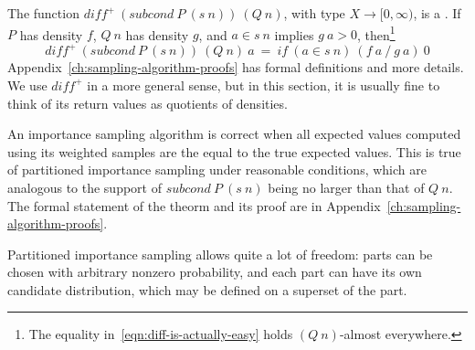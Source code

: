 The function $diff^+~(subcond~P~(s~n))~(Q~n)$, with type $X \to [0,\infty)$, is a .
If $P$ has density $f$, $Q~n$ has density $g$, and $a \in s~n$ implies $g~a > 0$, then\footnote{The equality in~\eqref{eqn:diff-is-actually-easy} holds $(Q~n)$-almost everywhere.}
\begin{equation}
	diff^+~(subcond~P~(s~n))~(Q~n)~a\ =\ if~(a \in s~n)~(f~a~{/}~g~a)~0
\label{eqn:diff-is-actually-easy}
\end{equation}
Appendix~\ref{ch:sampling-algorithm-proofs} has formal definitions and more details.
We use $diff^+$ in a more general sense, but in this section, it is usually fine to think of its return values as quotients of densities.

An importance sampling algorithm is correct when all expected values computed using its weighted samples are the equal to the true expected values.
This is true of partitioned importance sampling under reasonable conditions, which are analogous to the support of $subcond~P~(s~n)$ being no larger than that of $Q~n$.
The formal statement of the theorm and its proof are in Appendix~\ref{ch:sampling-algorithm-proofs}.

Partitioned importance sampling allows quite a lot of freedom: parts can be chosen with arbitrary nonzero probability, and each part can have its own candidate distribution, which may be defined on a superset of the part.

